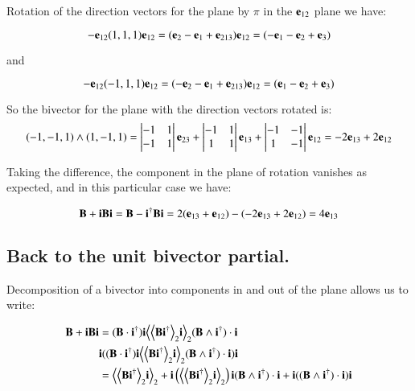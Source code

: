 \documentclass{article}      %
\newcommand{\gpgrade}[2] {{\left\langle{{#1}}\right\rangle}_{#2}}
\newcommand{\gpgradetwo}[1] {\gpgrade{#1}{2}}
\begin{document}
Rotation of the direction vectors for the plane by $\pi$ in the $\mathbf{e}_{12}$ plane we have:

\[
-\mathbf{e}_{12}(1,1,1)\mathbf{e}_{12}= 
(\mathbf{e}_{2}
-\mathbf{e}_{1}
+\mathbf{e}_{213})\mathbf{e}_{12}
= (-\mathbf{e}_{1} -\mathbf{e}_{2} + \mathbf{e}_{3})
\]

and

\[
-\mathbf{e}_{12}(-1,1,1)\mathbf{e}_{12}= 
(-\mathbf{e}_{2}
-\mathbf{e}_{1}
+\mathbf{e}_{213})\mathbf{e}_{12}
= (\mathbf{e}_{1} -\mathbf{e}_{2} + \mathbf{e}_{3})
\]

So the bivector for the plane with the direction vectors rotated is:
\[
(-1,-1,1)\wedge(1,-1,1) = 
\begin{vmatrix}
 -1 & 1 \\
 -1 & 1 \\
\end{vmatrix}
\mathbf{e}_{23}
+
\begin{vmatrix}
 -1 & 1 \\
 1 & 1 \\
\end{vmatrix}
\mathbf{e}_{13}
+
\begin{vmatrix}
 -1 & -1 \\
 1 & -1 \\
\end{vmatrix}
\mathbf{e}_{12}
=
-2\mathbf{e}_{13} + 2\mathbf{e}_{12}
\]

Taking the difference, the component in the plane of rotation vanishes as expected, and in this particular case we have:

\[
\mathbf{B} + \mathbf{i}\mathbf{B}\mathbf{i} = \mathbf{B} - \mathbf{i}^\dagger\mathbf{B}\mathbf{i} = 
2(\mathbf{e}_{13} + \mathbf{e}_{12}) -(-2\mathbf{e}_{13} + 2\mathbf{e}_{12}) = 4\mathbf{e}_{13}
\]

\subsection{ Back to the unit bivector partial. }

Decomposition of a bivector into components in and out of the plane allows us to write:

\begin{align*}
\BB + \Bi\BB\Bi
&=
(\BB \cdot {\Bi}^\dagger) \Bi 
\gpgradetwo{\gpgradetwo{\BB \Bi^\dagger} \Bi}
(\BB \wedge {\Bi}^\dagger) \cdot \Bi  \\
&\Bi(
(\BB \cdot {\Bi}^\dagger) \Bi 
\gpgradetwo{\gpgradetwo{\BB \Bi^\dagger} \Bi}
(\BB \wedge {\Bi}^\dagger) \cdot \Bi )\Bi \\
&=
\gpgradetwo{\gpgradetwo{\BB \Bi^\dagger} \Bi} + \Bi\left( \gpgradetwo{\gpgradetwo{\BB \Bi^\dagger} \Bi} \right)\Bi 
(\BB \wedge {\Bi}^\dagger) \cdot \Bi + \Bi( (\BB \wedge {\Bi}^\dagger) \cdot \Bi ) \Bi \\
\end{align*}
\end{document}
